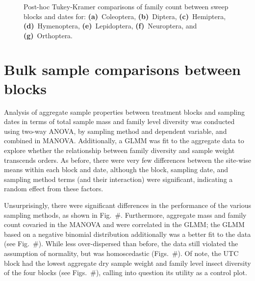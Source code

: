 \documentclass[10pt,letterpaper,twocolumn]{article}
\begin{document}
\begin{figure}[h]
\begin{subfigure}[b]{0.045\textwidth}
		\label{fig:sweep_orthoptera_family_tukey}
	\end{subfigure}
	\caption{Post-hoc Tukey-Kramer comparisons of family count between sweep blocks and dates for: \textbf{(a)}~Coleoptera, \textbf{(b)}~Diptera, \textbf{(c)}~Hemiptera, \textbf{(d)}~Hymenoptera, \textbf{(e)}~Lepidoptera, \textbf{(f)}~Neuroptera, and \textbf{(g)}~Orthoptera.}
	\label{fig:sweep_family_tukey}
	\smallskip
	\nointerlineskip
	\hrulefill
\end{figure}

\clearpage
\newpage

\section{Bulk sample comparisons between blocks}\label{sec:bulk}
Analysis of aggregate sample properties between treatment blocks and sampling dates in terms of total sample mass and family level diversity was conducted using two-way ANOVA, by sampling method and dependent variable, and combined in MANOVA.
Additionally, a GLMM was fit to the aggregate data to explore whether the relationship between family diversity and sample weight transcends orders.
As before, there were very few differences between the site-wise means within each block and date, although the block, sampling date, and sampling method terms (and their interaction) were significant, indicating a random effect from these factors.

Unsurprisingly, there were significant differences in the performance of the various sampling methods, as shown in Fig.~\#.
Furthermore, aggregate mass and family count covaried in the MANOVA and were correlated in the GLMM; the GLMM based on a negative binomial distribution additionally was a better fit to the data (see Fig.~\#).
While less over-dispersed than before, the data still violated the assumption of normality, but was homoscedastic (Figs.~\#).
Of note, the UTC block had the lowest aggregate dry sample weight and family level insect diversity of the four blocks (see Figs.~\#), calling into question its utility as a control plot.
\end{document}
